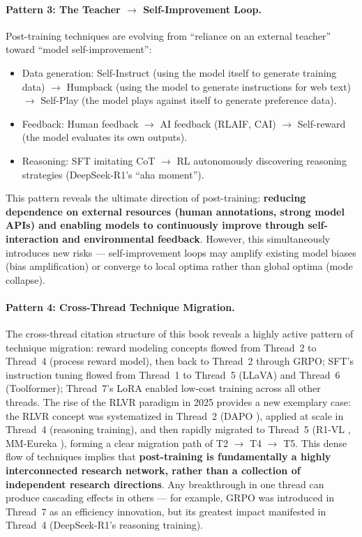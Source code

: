 \paragraph{Pattern 3: The Teacher $\rightarrow$ Self-Improvement Loop.}
Post-training techniques are evolving from ``reliance on an external teacher'' toward ``model self-improvement'':
\begin{itemize}[leftmargin=2em]
  \item Data generation: Self-Instruct (using the model itself to generate training data)
    $\rightarrow$ Humpback (using the model to generate instructions for web text)
    $\rightarrow$ Self-Play (the model plays against itself to generate preference data).
  \item Feedback: Human feedback $\rightarrow$ AI feedback (RLAIF, CAI)
    $\rightarrow$ Self-reward (the model evaluates its own outputs).
  \item Reasoning: SFT imitating CoT $\rightarrow$
    RL autonomously discovering reasoning strategies (DeepSeek-R1's ``aha moment'').
\end{itemize}
This pattern reveals the ultimate direction of post-training:
\textbf{reducing dependence on external resources (human annotations, strong model APIs)
and enabling models to continuously improve through self-interaction and environmental feedback}.
However, this simultaneously introduces new risks ---
self-improvement loops may amplify existing model biases (bias amplification)
or converge to local optima rather than global optima (mode collapse).

\paragraph{Pattern 4: Cross-Thread Technique Migration.}
The cross-thread citation structure of this book reveals a highly active pattern of technique migration:
reward modeling concepts flowed from Thread~2 to Thread~4 (process reward model),
then back to Thread~2 through GRPO;
SFT's instruction tuning flowed from Thread~1 to Thread~5 (LLaVA) and Thread~6 (Toolformer);
Thread~7's LoRA enabled low-cost training across all other threads.
The rise of the RLVR paradigm in 2025 provides a new exemplary case:
the RLVR concept was systematized in Thread~2 (DAPO \cite{yu2025dapo}),
applied at scale in Thread~4 (reasoning training),
and then rapidly migrated to Thread~5 (R1-VL \cite{zhang2025r1vl}, MM-Eureka \cite{meng2025mmeureka}),
forming a clear migration path of T2 $\rightarrow$ T4 $\rightarrow$ T5.
This dense flow of techniques implies that \textbf{post-training is fundamentally a highly interconnected research network,
rather than a collection of independent research directions}.
Any breakthrough in one thread can produce cascading effects in others ---
for example, GRPO was introduced in Thread~7 as an efficiency innovation,
but its greatest impact manifested in Thread~4 (DeepSeek-R1's reasoning training).


